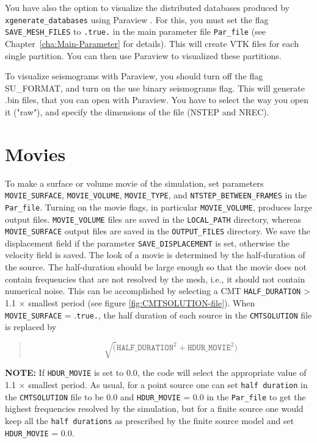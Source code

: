 You have also the option to visualize the distributed databases produced
by \texttt{xgenerate\_databases} using Paraview .
For this, you must set the flag \texttt{SAVE\_MESH\_FILES} to \texttt{.true.}
in the main parameter file \texttt{Par\_file} (see Chapter~\ref{cha:Main-Parameter}
for details). This will create VTK files for each single partition.
You can then use Paraview 
to visualized these partitions.

{\red To visualize seismograms with Paraview, you should turn off the flag SU\_FORMAT, and turn on the use binary seismograms flag. This will generate .bin files, that you can open with Paraview. You have to select the way you open it ("raw"), and specify the dimensions of the file (NSTEP and NREC).}

\section{Movies}\label{sec:Movies}

To make a surface or volume movie of the simulation, set parameters
\texttt{MOVIE\_SURFACE}, \texttt{MOVIE\_VOLUME}, \texttt{MOVIE\_TYPE},
and \texttt{NTSTEP\_BETWEEN\_FRAMES} in the \texttt{Par\_file}. Turning
on the movie flags, in particular \texttt{MOVIE\_VOLUME}, produces
large output files. \texttt{MOVIE\_VOLUME} files are saved in the
\texttt{LOCAL\_PATH} directory, whereas \texttt{MOVIE\_SURFACE} output
files are saved in the \texttt{OUTPUT\_FILES} directory. We save the
displacement field if the parameter \texttt{SAVE\_DISPLACEMENT} is
set, otherwise the velocity field is saved. The look of a movie is
determined by the half-duration of the source. The half-duration should
be large enough so that the movie does not contain frequencies that
are not resolved by the mesh, i.e., it should not contain numerical
noise. This can be accomplished by selecting a CMT \texttt{HALF\_DURATION}
> 1.1 $\times$ smallest period (see figure \ref{fig:CMTSOLUTION-file}).
When \texttt{MOVIE\_SURFACE} = .\texttt{true.}, the half duration
of each source in the \texttt{CMTSOLUTION} file is replaced by
\begin{quote}
\[
\sqrt{(}\mathrm{\mathtt{HALF\_DURATIO}\mathtt{N}^{2}}+\mathrm{\mathtt{HDUR\_MOVI}\mathtt{E}^{2}})
\]
\end{quote}

\textbf{NOTE:} If \texttt{HDUR\_MOVIE} is set to 0.0, the code will
select the appropriate value of 1.1 $\times$ smallest period. As
usual, for a point source one can set \texttt{half duration} in the
\texttt{CMTSOLUTION} file to be 0.0 and \texttt{HDUR\_MOVIE} = 0.0
in the \texttt{Par\_file} to get the highest frequencies resolved
by the simulation, but for a finite source one would keep all the
\texttt{half durations} as prescribed by the finite source model and
set \texttt{HDUR\_MOVIE} = 0.0.


